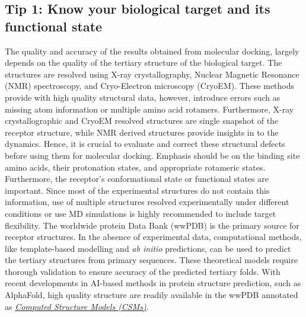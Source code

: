 \documentclass[10pt,letterpaper]{article}
\begin{document}
{{\subsection*{Tip 1: Know your biological target and its functional state}
The quality and accuracy of the results obtained from molecular docking, largely depends on the quality of the tertiary structure of the biological target. The structures are resolved using X-ray crystallography, Nuclear Magnetic Resonance (NMR) spectroscopy, and Cryo-Electron microscopy (CryoEM). These methods provide with high quality structural data, however, introduce errors such as missing atom information or multiple amino acid rotamers\cite{bib55, bib56}. Furthermore, X-ray crystallographic and CryoEM resolved structures are single snapshot of the receptor structure, while NMR derived structures provide insights in to the dynamics. Hence, it is crucial to evaluate and correct these structural defects before using them for molecular docking. Emphasis should be on the binding site amino acids, their protonation states, and appropriate rotameric states. Furthermore, the receptor's conformational state or functional states are important. Since most of the experimental structures do not contain this information, use of multiple structures resolved experimentally under different conditions or use MD simulations is highly recommended to include target flexibility. The worldwide protein Data Bank (wwPDB) is the primary source for receptor structures\cite{bib41}. In the absence of experimental data, computational methods, like template-based modelling and \textit{ab initio} predictions, can be used to predict the tertiary structures from primary sequences.  These theoretical models require thorough validation to ensure accuracy of the predicted tertiary folds. With recent developments in AI-based methods in protein structure prediction, such as AlphaFold\cite{bib37}, high quality structure are readily available in the wwPDB annotated as \href{https://pdb101.rcsb.org/learn/guide-to-understanding-pdb-data/computed-structure-models}{\textit{Computed Structure Models (CSMs)}}.

}}
\end{document}
